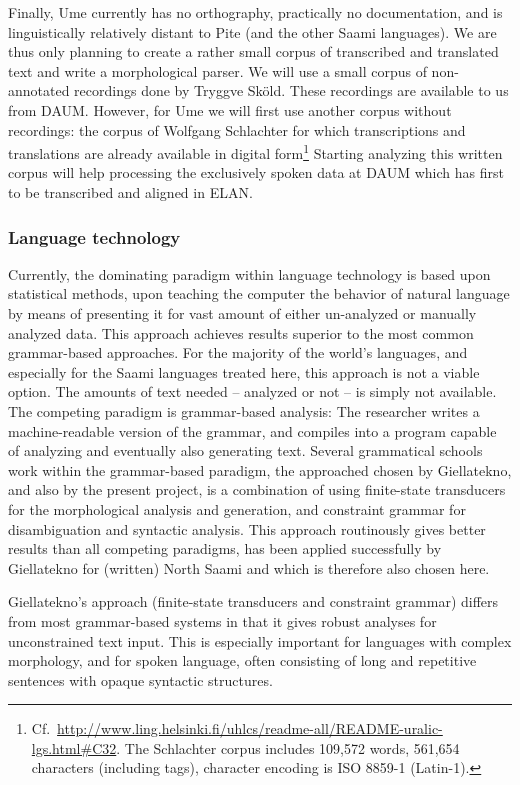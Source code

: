 \documentclass[a4paper,12pt]{article}
\begin{document}
Finally, Ume currently has no orthography, practically no documentation, and is linguistically relatively distant to Pite (and the other Saami languages). We are thus only planning to create a rather small corpus of transcribed and translated text and write a morphological parser. We will use a small corpus of non-annotated recordings done by Tryggve Sköld. These recordings are available to us from DAUM. However, for Ume we will first use another corpus without recordings: the corpus of Wolfgang Schlachter for which transcriptions and translations are already available in digital form\footnote{Cf.~\url{http://www.ling.helsinki.fi/uhlcs/readme-all/README-uralic-lgs.html#C32}. The Schlachter corpus includes 109,572 words, 561,654 characters (including tags), character encoding is ISO 8859-1 (Latin-1).} Starting analyzing this written corpus will help processing the exclusively spoken data at DAUM which has first to be transcribed and aligned in ELAN.

\subsubsection{Language technology}

Currently, the dominating paradigm within language technology is based upon statistical methods, upon teaching the computer the behavior of natural language by means of presenting it for vast amount of either un-analyzed or manually analyzed data. This approach achieves results superior to the most common grammar-based approaches. For the majority of the world's languages, and especially for the Saami languages treated here, this approach is not a viable option. The amounts of text needed – analyzed or not – is simply not available. The competing paradigm is grammar-based analysis: The researcher writes a machine-readable version of the grammar, and compiles into a program capable of analyzing and eventually also generating text. Several grammatical schools work within the grammar-based paradigm, the approached chosen by Giellatekno, and also by the present project, is a combination of using finite-state transducers for the morphological analysis and generation, and constraint grammar for disambiguation and syntactic analysis. This approach routinously gives better results than all competing paradigms, has been applied successfully by Giellatekno for (written) North Saami and which is therefore also chosen here.

Giellatekno's approach (finite-state transducers and constraint grammar) differs from most grammar-based systems in that it gives robust analyses for unconstrained text input. This is especially important for languages with complex morphology, and for spoken language, often consisting of long and repetitive sentences with opaque syntactic structures.
\end{document}
